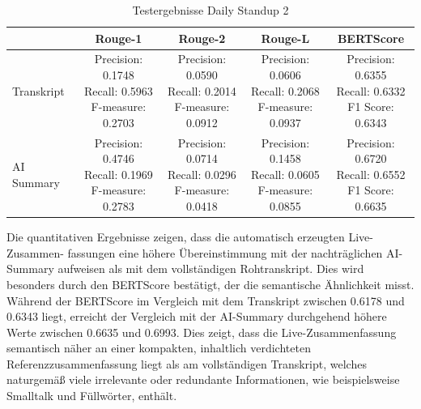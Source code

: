 \begin{table}[H]
    \centering
    \begin{tabular}{|p{2cm}|c|c|c|c|}
    \hline
     & \textbf{Rouge-1} & \textbf{Rouge-2} & \textbf{Rouge-L} &\textbf{BERTScore}\\ \hline
    \hline
    Transkript & \makecell[l]{Precision: 0.1748\\ Recall: 0.5963\\ F-measure: 0.2703} & \makecell[l]{Precision: 0.0590\\ Recall: 0.2014\\ F-measure: 0.0912} & \makecell[l]{Precision: 0.0606\\ Recall: 0.2068\\ F-measure: 0.0937} &\makecell[l]{Precision: 0.6355\\ Recall: 0.6332\\ F1 Score: 0.6343} \\
    \hline
    AI Summary & \makecell[l]{Precision: 0.4746\\ Recall: 0.1969\\ F-measure: 0.2783} & \makecell[l]{Precision: 0.0714\\ Recall: 0.0296\\ F-measure: 0.0418} & \makecell[l]{Precision: 0.1458\\ Recall: 0.0605\\ F-measure: 0.0855} &\makecell[l]{Precision: 0.6720\\ Recall: 0.6552\\ F1 Score: 0.6635} \\
    \hline
    \end{tabular}
    \caption{Testergebnisse Daily Standup 2}
    \label{tab:test3}
\end{table}

Die quantitativen Ergebnisse zeigen, dass die automatisch erzeugten Live-Zusammen- fassungen eine höhere Übereinstimmung mit der nachträglichen AI-Summary aufweisen als mit dem vollständigen Rohtranskript. Dies wird besonders durch den BERTScore bestätigt, der die semantische Ähnlichkeit misst. Während der BERTScore im Vergleich mit dem Transkript zwischen 0.6178 und 0.6343 liegt, erreicht der Vergleich mit der AI-Summary durchgehend höhere Werte zwischen 0.6635 und 0.6993. Dies zeigt, dass die Live-Zusammenfassung semantisch näher an einer kompakten, inhaltlich verdichteten Referenzzusammenfassung liegt als am vollständigen Transkript, welches naturgemäß viele irrelevante oder redundante Informationen, wie beispielsweise Smalltalk und Füllwörter, enthält.

